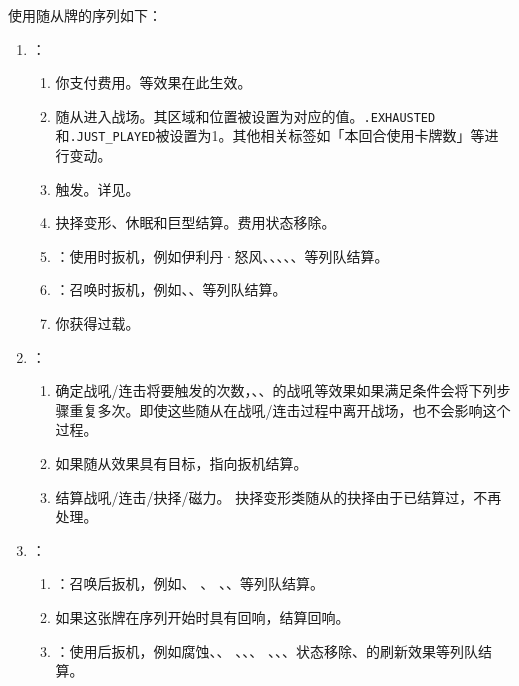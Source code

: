 使用随从牌的序列如下：
\begin{enumerate}
    \item {}：
    \begin{enumerate}
        \item 你支付费用。等效果在此生效。
        \item 随从进入战场。其区域和位置被设置为对应的值。\texttt{.EXHAUSTED}和\texttt{.JUST\_\allowbreak{}PLAYED}被设置为1。其他相关标签如「本回合使用卡牌数」等进行变动。
        \item {}触发。详见。
        \item 抉择变形、休眠和巨型结算。费用状态移除。
        \item {}：使用时扳机，例如伊利丹·怒风、、、、、等列队结算。
        \item {}：召唤时扳机，例如、、等列队结算。
        \item 你获得过载。
    \end{enumerate}

    \item {}：
    \begin{enumerate}
        \item 确定战吼/连击将要触发的次数，、、的战吼等效果如果满足条件会将下列步骤重复多次。即使这些随从在战吼/连击过程中离开战场，也不会影响这个过程。
        \item 如果随从效果具有目标，指向扳机结算。
        \item 结算战吼/连击/抉择/磁力。
            \exception 抉择变形类随从的抉择由于已结算过，不再处理。
    \end{enumerate}

    \item {}：
    \begin{enumerate}
        \item {}：召唤后扳机，例如、 、 、、等列队结算。
        \item 如果这张牌在序列开始时具有回响，结算回响。
        \item {}：使用后扳机，例如腐蚀、、 、、、 、、、状态移除、的刷新效果等列队结算。
    \end{enumerate}

\end{enumerate}

